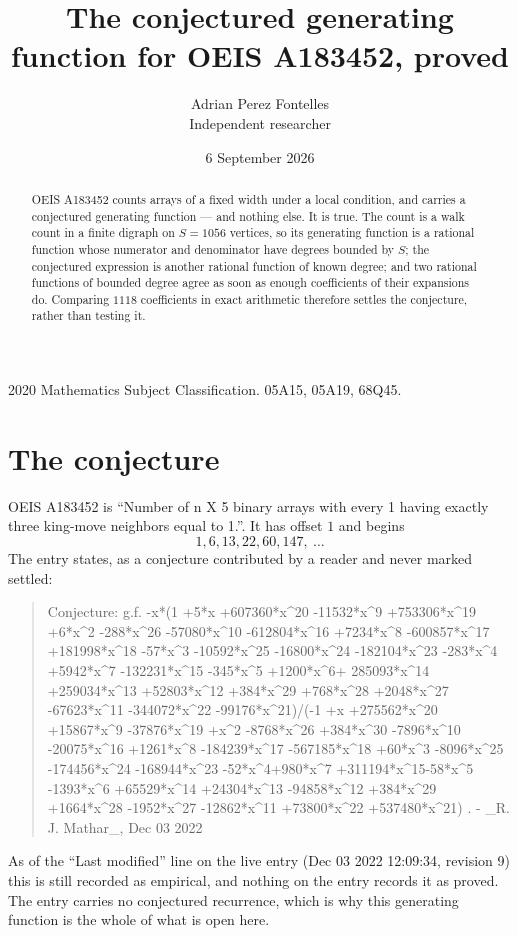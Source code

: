\documentclass[11pt,a4paper]{article}
\title{The conjectured generating function for OEIS A183452, proved}
\author{Adrian Perez Fontelles\\ \small Independent researcher}
\date{6 September 2026}
\theoremstyle{plain}
\theoremstyle{definition}
\begin{document}
\maketitle

\begin{abstract}
OEIS A183452 counts arrays of a fixed width under a local condition, and carries a conjectured
generating function --- and nothing else. It is true. The count is a walk count in a finite
digraph on $S=1056$ vertices, so its generating function is a rational function whose numerator
and denominator have degrees bounded by $S$; the conjectured expression is another rational
function of known degree; and two rational functions of bounded degree agree as soon as enough
coefficients of their expansions do. Comparing $1118$ coefficients in exact arithmetic
therefore settles the conjecture, rather than testing it.
\end{abstract}

\noindent\small 2020 Mathematics Subject Classification. 05A15, 05A19, 68Q45.\normalsize

\section{The conjecture}

OEIS A183452 is ``Number of n X 5 binary arrays with every 1 having exactly three king-move neighbors equal to 1.''. It has offset $1$ and begins
\[
1, 6, 13, 22, 60, 147,\ \dots
\]
The entry states, as a conjecture contributed by a reader and never marked settled:
\begin{quote}
Conjecture: g.f. -x*(1 +5*x +607360*x\^{}20 -11532*x\^{}9 +753306*x\^{}19 +6*x\^{}2 -288*x\^{}26 -57080*x\^{}10 -612804*x\^{}16 +7234*x\^{}8 -600857*x\^{}17 +181998*x\^{}18 -57*x\^{}3 -10592*x\^{}25 -16800*x\^{}24 -182104*x\^{}23 -283*x\^{}4 +5942*x\^{}7 -132231*x\^{}15 -345*x\^{}5 +1200*x\^{}6+ 285093*x\^{}14 +259034*x\^{}13 +52803*x\^{}12 +384*x\^{}29 +768*x\^{}28 +2048*x\^{}27 -67623*x\^{}11 -344072*x\^{}22 -99176*x\^{}21)/(-1 +x +275562*x\^{}20 +15867*x\^{}9 -37876*x\^{}19 +x\^{}2 -8768*x\^{}26 +384*x\^{}30 -7896*x\^{}10 -20075*x\^{}16 +1261*x\^{}8 -184239*x\^{}17 -567185*x\^{}18 +60*x\^{}3 -8096*x\^{}25 -174456*x\^{}24 -168944*x\^{}23 -52*x\^{}4+980*x\^{}7 +311194*x\^{}15-58*x\^{}5 -1393*x\^{}6 +65529*x\^{}14 +24304*x\^{}13 -94858*x\^{}12 +384*x\^{}29 +1664*x\^{}28 -1952*x\^{}27 -12862*x\^{}11 +73800*x\^{}22 +537480*x\^{}21) . - \_R. J. Mathar\_, Dec 03 2022
\end{quote}
As of the ``Last modified'' line on the live entry (Dec 03 2022 12:09:34, revision 9) this is still
recorded as empirical, and nothing on the entry records it as proved. The entry carries no
conjectured recurrence, which is why this generating function is the whole of what is open
here.
\end{document}
